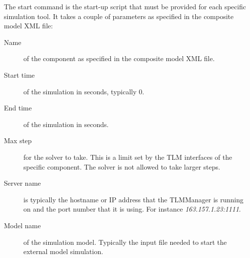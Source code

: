 The start command is the start-up script that must be provided for each specific simulation tool. 
It takes a couple of parameters as specified in the composite model XML file:
\begin{description}
\item[Name] of the component as specified in the composite model XML file.
\item[Start time] of the simulation in seconds, typically 0.
\item[End time] of the simulation in seconds.
\item[Max step] for the solver to take. This is a limit set by the TLM interfaces of the specific component. 
The solver is not allowed to take larger steps.
\item[Server name] is typically the hostname or IP address that the TLMManager is running on and the port number that it is using. 
For  instance {\it 163.157.1.23:1111}.
\item[Model name] of the simulation model. Typically the input file
  needed to start the external model simulation.
\end{description}


